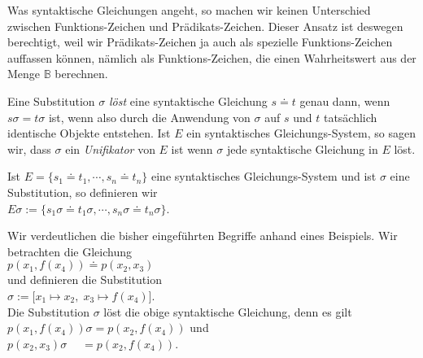 Was syntaktische Gleichungen angeht, so machen wir keinen Unterschied zwischen Funktions-Zeichen und
Pr\"{a}dikats-Zeichen.   Dieser Ansatz ist deswegen berechtigt, weil wir Pr\"{a}dikats-Zeichen
ja auch als spezielle Funktions-Zeichen auffassen k\"{o}nnen, n\"{a}mlich als 
Funktions-Zeichen, die einen Wahrheitswert aus der Menge   $\mathbb{B}$ berechnen.

\begin{Definition}[Unifikator]
Eine Substitution $\sigma$ {\emph{\color{blue}l\"{o}st}} eine syntaktische Gleichung $s \doteq t$ genau dann, wenn
$s\sigma = t\sigma$ ist, wenn also durch die Anwendung von $\sigma$ auf $s$ und $t$
tats\"{a}chlich identische Objekte entstehen.  Ist $E$ ein syntaktisches Gleichungs-System, so 
sagen wir, dass $\sigma$ ein {\emph{\color{blue}Unifikator}} von $E$ ist wenn $\sigma$ jede
syntaktische Gleichung in $E$ l\"{o}st. 
\eox
\end{Definition}
Ist $E = \{ s_1 \doteq t_1, \cdots, s_n \doteq t_n \}$ eine syntaktisches Gleichungs-System
und ist $\sigma$ eine Substitution, so definieren wir \\[0.2cm]
\hspace*{1.3cm}  $E\sigma := \{ s_1\sigma \doteq t_1\sigma, \cdots, s_n\sigma \doteq t_n\sigma \}$.
\vspace{0.3cm}

\example
Wir verdeutlichen die bisher eingef\"{u}hrten Begriffe anhand eines Beispiels.  
Wir betrachten die Gleichung \\[0.2cm]
\hspace*{1.3cm} $p(x_1, f(x_4)) \doteq p( x_2, x_3)$ \\[0.2cm]
und definieren die Substitution \\[0.2cm]
\hspace*{1.3cm} $\sigma := \big[ x_1 \mapsto x_2,\; x_3 \mapsto f(x_4) \big]$. \\[0.2cm]
Die Substitution $\sigma$ l\"{o}st die obige syntaktische Gleichung, denn es gilt \\[0.2cm]
\hspace*{1.3cm} $p(x_1, f(x_4))\sigma = p(x_2, f(x_4))$ \quad und \quad \\[0.2cm]
\hspace*{1.3cm} $p(x_2, x_3)\sigma \;\quad = p(x_2, f(x_4))$.  \eox


